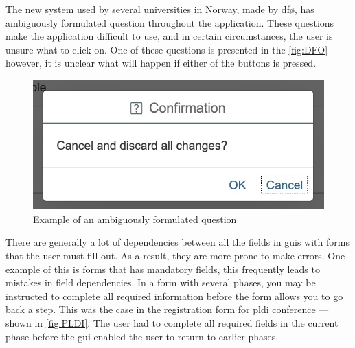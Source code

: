 The new system used by several universities in Norway, made by \gls{dfø}, has ambiguously formulated question throughout the application. These questions make the application difficult to use, and in certain circumstances, the user is unsure what to click on. One of these questions is presented in the \autoref{fig:DFO} --- however, it is unclear what will happen if either of the buttons is pressed.

\begin{figure}[h]
    \centering
    \includegraphics[scale=0.55, frame]{figures/DFO.jpg}
    \caption{Example of an ambiguously formulated question}
    \label{fig:DFO}
\end{figure}

There are generally a lot of dependencies between all the fields in \gls{gui}s with forms that the user must fill out. As a result, they are more prone to make errors. One example of this is forms that has mandatory fields, this frequently leads to mistakes in field dependencies. In a form with several phases, you may be instructed to complete all required information before the form allows you to go back a step. This was the case in the registration form for \gls{pldi} conference --- shown in \autoref{fig:PLDI}. The user had to complete all required fields in the current phase before the \gls{gui} enabled the user to return to earlier phases. 


